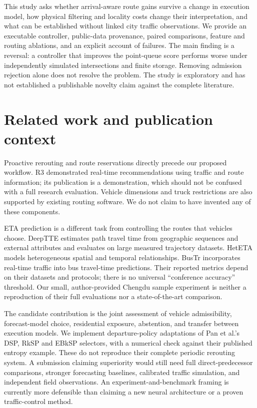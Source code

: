 \documentclass[sigconf,anonymous,review]{acmart}
\begin{document}
This study asks whether arrival-aware route gains survive a change in execution model, how physical filtering and locality costs change their interpretation, and what can be established without linked city traffic observations. We provide an executable controller, public-data provenance, paired comparisons, feature and routing ablations, and an explicit account of failures. The main finding is a reversal: a controller that improves the point-queue score performs worse under independently simulated intersections and finite storage. Removing admission rejection alone does not resolve the problem. The study is exploratory and has not established a publishable novelty claim against the complete literature.

\section{Related work and publication context}
Proactive rerouting and route reservations directly precede our proposed workflow\cite{pan2012,reservation2018}. R3 demonstrated real-time recommendations using traffic and route information\cite{r32014}; its publication is a demonstration, which should not be confused with a full research evaluation. Vehicle dimensions and truck restrictions are also supported by existing routing software\cite{valhalla}. We do not claim to have invented any of these components.

ETA prediction is a different task from controlling the routes that vehicles choose. DeepTTE estimates path travel time from geographic sequences and external attributes and evaluates on large measured trajectory datasets\cite{deeptte2018}. HetETA models heterogeneous spatial and temporal relationships\cite{heteta2020}. BusTr incorporates real-time traffic into bus travel-time predictions\cite{bustr2020}. Their reported metrics depend on their datasets and protocols; there is no universal ``conference accuracy'' threshold. Our small, author-provided Chengdu sample experiment is neither a reproduction of their full evaluations nor a state-of-the-art comparison.

The candidate contribution is the joint assessment of vehicle admissibility, forecast-model choice, residential exposure, abstention, and transfer between execution models. We implement departure-policy adaptations of Pan et al.'s DSP, RkSP and EBkSP selectors, with a numerical check against their published entropy example. These do not reproduce their complete periodic rerouting system. A submission claiming superiority would still need full direct-predecessor comparisons, stronger forecasting baselines, calibrated traffic simulation, and independent field observations. An experiment-and-benchmark framing is currently more defensible than claiming a new neural architecture or a proven traffic-control method.
\end{document}
